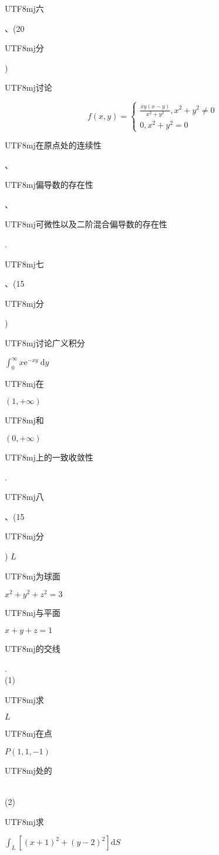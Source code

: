 \documentclass[10pt]{article}
\begin{document}
\begin{CJK}{UTF8}{mj}六\end{CJK}、(20 \begin{CJK}{UTF8}{mj}分\end{CJK}) \begin{CJK}{UTF8}{mj}讨论\end{CJK}
$$
f(x, y)=\left\{\begin{array}{l}
\frac{x y(x-y)}{x^{2}+y^{2}}, x^{2}+y^{2} \neq 0 \\
0, x^{2}+y^{2}=0
\end{array}\right.
$$
\begin{CJK}{UTF8}{mj}在原点处的连续性\end{CJK}、\begin{CJK}{UTF8}{mj}偏导数的存在性\end{CJK}、\begin{CJK}{UTF8}{mj}可微性以及二阶混合偏导数的存在性\end{CJK}.

\begin{CJK}{UTF8}{mj}七\end{CJK}、(15 \begin{CJK}{UTF8}{mj}分\end{CJK}) \begin{CJK}{UTF8}{mj}讨论广义积分\end{CJK} $\int_{0}^{\infty} x \mathrm{e}^{-x y} \mathrm{~d} y$ \begin{CJK}{UTF8}{mj}在\end{CJK} $(1,+\infty)$ \begin{CJK}{UTF8}{mj}和\end{CJK} $(0,+\infty)$ \begin{CJK}{UTF8}{mj}上的一致收敛性\end{CJK}.

\begin{CJK}{UTF8}{mj}八\end{CJK}、(15 \begin{CJK}{UTF8}{mj}分\end{CJK}) $L$ \begin{CJK}{UTF8}{mj}为球面\end{CJK} $x^{2}+y^{2}+z^{2}=3$ \begin{CJK}{UTF8}{mj}与平面\end{CJK} $x+y+z=1$ \begin{CJK}{UTF8}{mj}的交线\end{CJK}.\\
(1) \begin{CJK}{UTF8}{mj}求\end{CJK} $L$ \begin{CJK}{UTF8}{mj}在点\end{CJK} $P(1,1,-1)$ \begin{CJK}{UTF8}{mj}处的\end{CJK}\\
(2) \begin{CJK}{UTF8}{mj}求\end{CJK} $\int_{L}\left[(x+1)^{2}+(y-2)^{2}\right] \mathrm{d} S$
\end{document}
